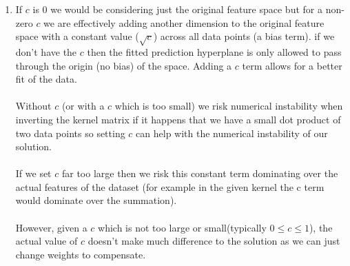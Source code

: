 \documentclass{article}
\begin{document}
\begin{enumerate}
\begin{enumerate}
        \item If $c$ is 0 we would be considering just the original feature space but for a non-zero $c$ we are effectively adding another dimension to the original feature space with a constant value ($\sqrt{c}$) across all data points (a bias term). if we don't have the $c$ then the fitted prediction hyperplane is only allowed to pass through the origin (no bias) of the space. Adding a $c$ term allows for a better fit of the data.
        \\\\
        Without $c$ (or with a $c$ which is too small) we risk numerical instability when inverting the kernel matrix if it happens that we have a small dot product of two data points so setting $c$ can help with the numerical instability of our solution.
        \\\\
        If we set $c$ far too large then we risk this constant term dominating over the actual features of the dataset (for example in the given kernel the c term would dominate over the summation).
        \\\\
        However, given a $c$ which is not too large or small(typically $ {0}\leq{c}\leq{1}$), the actual value of $c$ doesn't make much difference to the solution as we can just change weights to compensate.







\end{enumerate}
\end{enumerate}
\end{document}
